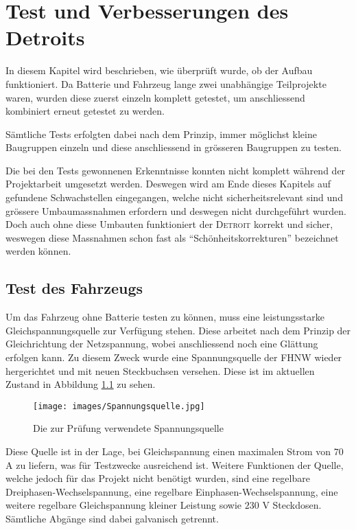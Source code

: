 \chapter{Test und Verbesserungen des Detroits}
In diesem Kapitel wird beschrieben, wie überprüft wurde, ob der Aufbau funktioniert. Da Batterie und Fahrzeug lange zwei unabhängige Teilprojekte waren, wurden diese zuerst einzeln komplett getestet, um anschliessend kombiniert erneut getestet zu werden.

Sämtliche Tests erfolgten dabei nach dem Prinzip, immer möglichst kleine Baugruppen einzeln und diese anschliessend in grösseren Baugruppen zu testen.

Die bei den Tests gewonnenen Erkenntnisse konnten nicht komplett während der Projektarbeit umgesetzt werden. Deswegen wird am Ende dieses Kapitels auf gefundene Schwachstellen eingegangen, welche nicht sicherheitsrelevant sind und grössere Umbaumassnahmen erfordern und deswegen nicht durchgeführt wurden. Doch auch ohne diese Umbauten funktioniert der \textsc{Detroit} korrekt und sicher, weswegen diese Massnahmen schon fast als "`Schönheitskorrekturen"' bezeichnet werden können.

\section{Test des Fahrzeugs}
Um das Fahrzeug ohne Batterie testen zu können, muss eine leistungsstarke Gleichspannungsquelle zur Verfügung stehen. Diese arbeitet nach dem Prinzip der Gleichrichtung der Netzspannung, wobei anschliessend noch eine Glättung erfolgen kann. Zu diesem Zweck wurde eine Spannungsquelle der FHNW wieder hergerichtet und mit neuen Steckbuchsen versehen. Diese ist im aktuellen Zustand in Abbildung \ref{fig:Spannungsquelle_blau} zu sehen.

\begin{figure}[h]
	\centering
		\texttt{[image: images/Spannungsquelle.jpg]}
	\caption{Die zur Prüfung verwendete Spannungsquelle}
	\label{fig:Spannungsquelle_blau}
\end{figure}

Diese Quelle ist in der Lage, bei Gleichspannung einen maximalen Strom von $70$ A zu liefern, was für Testzwecke ausreichend ist. Weitere Funktionen der Quelle, welche jedoch für das Projekt nicht benötigt wurden, sind eine regelbare Dreiphasen-Wechselspannung, eine regelbare Einphasen-Wechselspannung, eine weitere regelbare Gleichspannung kleiner Leistung sowie $230$ V Steckdosen. Sämtliche Abgänge sind dabei galvanisch getrennt.

